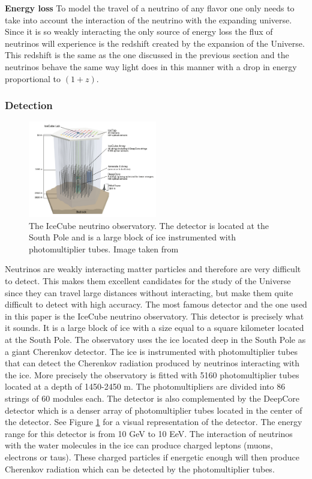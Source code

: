\textbf{Energy loss}
To model the travel of a neutrino of any flavor one only needs to take into account the interaction of the neutrino with the expanding universe. Since it is so weakly interacting the only 
source of energy loss the flux of neutrinos will experience is the redshift created by the expansion of the Universe. This redshift is the same as the one discussed in the previous section and the neutrinos 
behave the same way light does in this manner with a drop in energy proportional to $(1+z)$.



 

\subsubsection{Detection}
\begin{figure}
    \centering
    \includegraphics[width = 0.5\textwidth]{Ice_cube_layot.png}
    \caption{The IceCube neutrino observatory. The detector is located at the South Pole and is a large block of ice instrumented with photomultiplier tubes. Image taken from \cite{Andeen_2019}}
    \label{fig:Ice_cube}
\end{figure}

Neutrinos are weakly interacting matter particles and therefore are very difficult to detect. This makes them excellent candidates for the study of the Universe since they can travel large distances without interacting, but make them 
quite difficult to detect with high accuracy. The most famous detector and the one used in this paper is the IceCube neutrino observatory. This detector is precisely what it sounds. It is a large block of ice with a size equal to a square kilometer located at the South Pole.
The observatory uses the ice located deep in the South Pole as a giant Cherenkov detector. The ice is instrumented with photomultiplier tubes that can detect the Cherenkov radiation produced by neutrinos interacting with the ice. 
More precisely the observatory is fitted with 5160 photomultiplier tubes located at a depth of 1450-2450 m. The photomultipliers are divided into 86 strings of 60 modules each. The detector is also complemented by the DeepCore detector which is a denser array of photomultiplier tubes located in the center of the detector. See Figure \ref{fig:Ice_cube} for a visual representation of the detector.
The energy range for this detector is from 10 GeV to 10 EeV. The interaction of neutrinos with the water molecules in the ice can produce charged leptons (muons, electrons or taus). These charged particles if energetic enough will then produce Cherenkov radiation which can be detected by the photomultiplier tubes.



